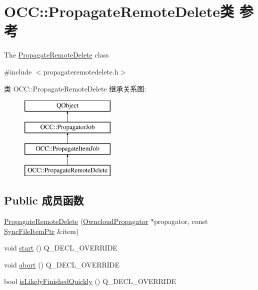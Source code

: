 \hypertarget{class_o_c_c_1_1_propagate_remote_delete}{}\section{O\+CC\+:\+:Propagate\+Remote\+Delete类 参考}
\label{class_o_c_c_1_1_propagate_remote_delete}


The \hyperlink{class_o_c_c_1_1_propagate_remote_delete}{Propagate\+Remote\+Delete} class  




{\ttfamily \#include $<$propagateremotedelete.\+h$>$}

类 O\+CC\+:\+:Propagate\+Remote\+Delete 继承关系图\+:\begin{figure}[H]
\begin{center}
\leavevmode
\includegraphics[height=4.000000cm]{class_o_c_c_1_1_propagate_remote_delete}
\end{center}
\end{figure}
\subsection*{Public 成员函数}
\begin{DoxyCompactItemize}
\item 
\hyperlink{class_o_c_c_1_1_propagate_remote_delete_aab08a1628b9ea0a0067eb4f6361f29ce}{Propagate\+Remote\+Delete} (\hyperlink{class_o_c_c_1_1_owncloud_propagator}{Owncloud\+Propagator} $\ast$propagator, const \hyperlink{namespace_o_c_c_acb6b0db82893659fbd0c98d3c5b8e2b8}{Sync\+File\+Item\+Ptr} \&item)
\item 
void \hyperlink{class_o_c_c_1_1_propagate_remote_delete_afa9cfbdf647e648209af60ef224216b9}{start} () Q\+\_\+\+D\+E\+C\+L\+\_\+\+O\+V\+E\+R\+R\+I\+DE
\item 
void \hyperlink{class_o_c_c_1_1_propagate_remote_delete_aae847c982bf4a7470799cf905e2357ee}{abort} () Q\+\_\+\+D\+E\+C\+L\+\_\+\+O\+V\+E\+R\+R\+I\+DE
\item 
bool \hyperlink{class_o_c_c_1_1_propagate_remote_delete_ae58450c9a1deb1d19f52c8f057efbcc0}{is\+Likely\+Finished\+Quickly} () Q\+\_\+\+D\+E\+C\+L\+\_\+\+O\+V\+E\+R\+R\+I\+DE
\end{DoxyCompactItemize}
